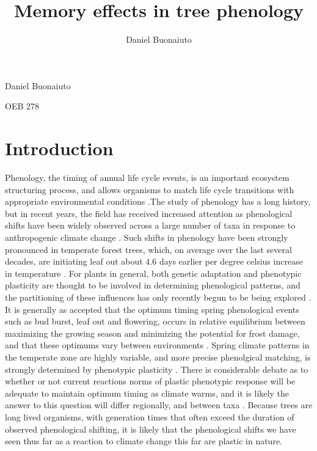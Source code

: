 \documentclass{article}\usepackage[]{graphicx}\usepackage[]{color}
\begin{document}
\title{Memory effects in tree phenology}
\author{Daniel Buonaiuto}
Daniel Buonaiuto
\par OEB 278
\par\data{\today}
\section*{Introduction}
\par Phenology, the timing of annual life cycle events, is an important ecosystem structuring process, and allows organisms to match life cycle transitions with appropriate environmental conditions \citep{Forrest2010}.The study of phenology has a long history, but in recent years, the field has received increased attention as phenological shifts have been widely observed across a large number of taxa in response to anthropogenic climate change \citep{Menzel2006}. Such shifts in phenology have been strongly pronounced in temperate forest trees, which, on average over the last several decades, are initiating leaf out about 4.6 days earlier per degree celsius increase in temperature \citep{Wolkovich2012}. For plants in general, both genetic adaptation and phenotypic plasticity are thought to be involved in determining phenological patterns, and the partitioning of these influences has only recently begun to be being explored \citep{Anderson2012}. It is generally as accepted that the optimum timing spring phenological events such as bud burst, leaf out and flowering, occurs in relative equilibrium between maximizing the growing season and minimizing the potential for frost damage, and that these optimums vary between environments \citep{Kramer1995}. Spring climate patterns in the temperate zone are highly variable, and more precise phenolgical matching, is strongly determined by phenotypic plasticity \citep{Vitasse2010,Vitasse2013}. There is considerable debate as to whether or not current reactions norms of plastic phenotypic response will be adequate to maintain optimum timing as climate warms, and it is likely the answer to this question will differ regionally, and between taxa \citep{Matesanz2010}. Because trees are long lived organisms, with generation times that often exceed the duration of observed phenological shifting, it is likely that the phenological shifts we have seen thus far as a reaction to climate change this far are plastic in nature.
\end{document}
